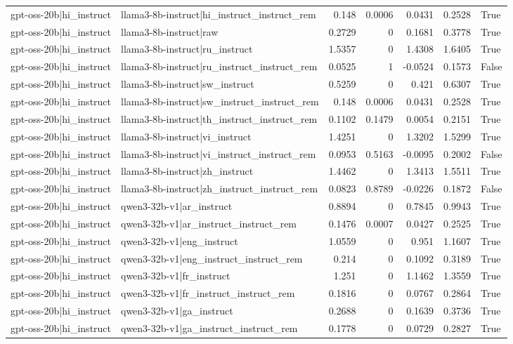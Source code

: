\begin{table}
\begin{tabular}{l l r r r r l}
gpt-oss-20b|hi_instruct & llama3-8b-instruct|hi_instruct_instruct_rem & 0.148 & 0.0006 & 0.0431 & 0.2528 & True \\
gpt-oss-20b|hi_instruct & llama3-8b-instruct|raw & 0.2729 & 0 & 0.1681 & 0.3778 & True \\
gpt-oss-20b|hi_instruct & llama3-8b-instruct|ru_instruct & 1.5357 & 0 & 1.4308 & 1.6405 & True \\
gpt-oss-20b|hi_instruct & llama3-8b-instruct|ru_instruct_instruct_rem & 0.0525 & 1 & -0.0524 & 0.1573 & False \\
gpt-oss-20b|hi_instruct & llama3-8b-instruct|sw_instruct & 0.5259 & 0 & 0.421 & 0.6307 & True \\
gpt-oss-20b|hi_instruct & llama3-8b-instruct|sw_instruct_instruct_rem & 0.148 & 0.0006 & 0.0431 & 0.2528 & True \\
gpt-oss-20b|hi_instruct & llama3-8b-instruct|th_instruct_instruct_rem & 0.1102 & 0.1479 & 0.0054 & 0.2151 & True \\
gpt-oss-20b|hi_instruct & llama3-8b-instruct|vi_instruct & 1.4251 & 0 & 1.3202 & 1.5299 & True \\
gpt-oss-20b|hi_instruct & llama3-8b-instruct|vi_instruct_instruct_rem & 0.0953 & 0.5163 & -0.0095 & 0.2002 & False \\
gpt-oss-20b|hi_instruct & llama3-8b-instruct|zh_instruct & 1.4462 & 0 & 1.3413 & 1.5511 & True \\
gpt-oss-20b|hi_instruct & llama3-8b-instruct|zh_instruct_instruct_rem & 0.0823 & 0.8789 & -0.0226 & 0.1872 & False \\
gpt-oss-20b|hi_instruct & qwen3-32b-v1|ar_instruct & 0.8894 & 0 & 0.7845 & 0.9943 & True \\
gpt-oss-20b|hi_instruct & qwen3-32b-v1|ar_instruct_instruct_rem & 0.1476 & 0.0007 & 0.0427 & 0.2525 & True \\
gpt-oss-20b|hi_instruct & qwen3-32b-v1|eng_instruct & 1.0559 & 0 & 0.951 & 1.1607 & True \\
gpt-oss-20b|hi_instruct & qwen3-32b-v1|eng_instruct_instruct_rem & 0.214 & 0 & 0.1092 & 0.3189 & True \\
gpt-oss-20b|hi_instruct & qwen3-32b-v1|fr_instruct & 1.251 & 0 & 1.1462 & 1.3559 & True \\
gpt-oss-20b|hi_instruct & qwen3-32b-v1|fr_instruct_instruct_rem & 0.1816 & 0 & 0.0767 & 0.2864 & True \\
gpt-oss-20b|hi_instruct & qwen3-32b-v1|ga_instruct & 0.2688 & 0 & 0.1639 & 0.3736 & True \\
gpt-oss-20b|hi_instruct & qwen3-32b-v1|ga_instruct_instruct_rem & 0.1778 & 0 & 0.0729 & 0.2827 & True \\

\end{tabular}
\end{table}
